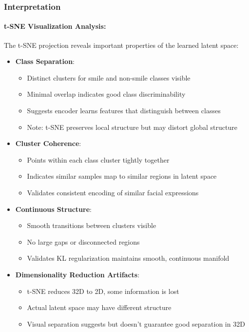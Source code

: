 \documentclass[conference]{IEEEtran}
\begin{document}
\subsubsection{Interpretation}

\paragraph{t-SNE Visualization Analysis:}
The t-SNE projection reveals important properties of the learned latent space:

\begin{itemize}
    \item \textbf{Class Separation}:
    \begin{itemize}
        \item Distinct clusters for smile and non-smile classes visible
        \item Minimal overlap indicates good class discriminability
        \item Suggests encoder learns features that distinguish between classes
        \item Note: t-SNE preserves local structure but may distort global structure
    \end{itemize}
    
    \item \textbf{Cluster Coherence}:
    \begin{itemize}
        \item Points within each class cluster tightly together
        \item Indicates similar samples map to similar regions in latent space
        \item Validates consistent encoding of similar facial expressions
    \end{itemize}
    
    \item \textbf{Continuous Structure}:
    \begin{itemize}
        \item Smooth transitions between clusters visible
        \item No large gaps or disconnected regions
        \item Validates KL regularization maintains smooth, continuous manifold
    \end{itemize}
    
    \item \textbf{Dimensionality Reduction Artifacts}:
    \begin{itemize}
        \item t-SNE reduces 32D to 2D, some information is lost
        \item Actual latent space may have different structure
        \item Visual separation suggests but doesn't guarantee good separation in 32D
    \end{itemize}
\end{itemize}
\end{document}
